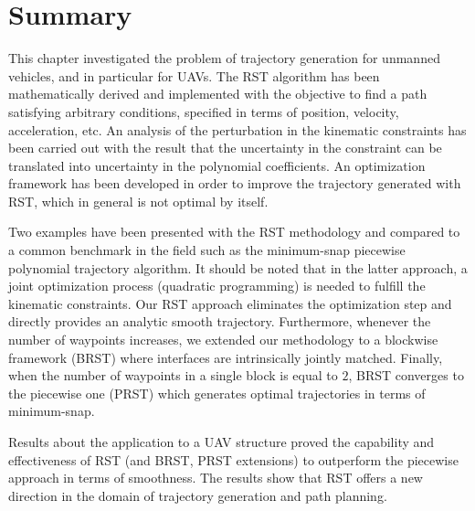 \section{Summary}
\label{subsec:rst_con}
This chapter investigated the problem of trajectory generation for unmanned vehicles, and in particular for UAVs. The RST algorithm has been mathematically derived and implemented with the objective to find a path satisfying arbitrary conditions, specified in terms of position, velocity, acceleration, etc. An analysis of the perturbation in the kinematic constraints has been carried out with the result that the uncertainty in the constraint can be translated into uncertainty in the polynomial coefficients. An optimization framework has been developed in order to improve the trajectory generated with RST, which in general is not optimal by itself. 

Two examples have been presented with the RST methodology and compared to a common benchmark in the field such as the minimum-snap piecewise polynomial trajectory algorithm. It should be noted that in the latter approach, a joint optimization process (quadratic programming) is needed to fulfill the kinematic constraints. Our RST approach eliminates the optimization step and directly provides an analytic smooth trajectory. Furthermore, whenever the number of waypoints increases, we extended our methodology to a blockwise framework (BRST) where interfaces are intrinsically jointly matched. Finally, when the number of waypoints in a single block is equal to $2$, BRST converges to the piecewise one (PRST) which generates optimal trajectories in terms of minimum-snap.  

Results about the application to a UAV structure proved the capability and effectiveness of RST (and BRST, PRST extensions) to outperform the piecewise approach in terms of smoothness. The results show that RST offers a new direction in the domain of trajectory generation and path planning.